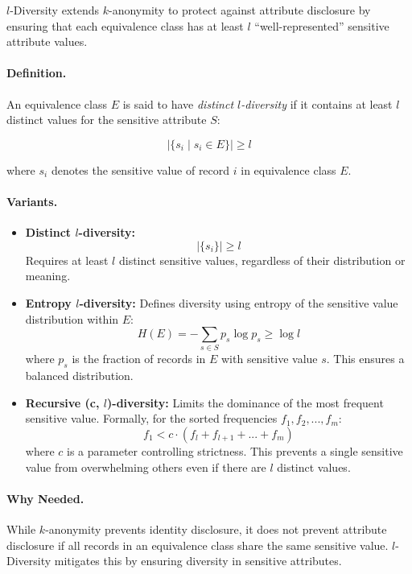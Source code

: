 \documentclass{article}
\begin{document}
$l$-Diversity extends $k$-anonymity to protect against attribute disclosure by ensuring that each equivalence class has at least $l$ ``well-represented'' sensitive attribute values.

\paragraph{ Definition.}
An equivalence class $E$ is said to have \textit{distinct $l$-diversity} if it contains at least $l$ distinct values for the sensitive attribute $S$:

\[
|\{ s_i \mid s_i \in E \}| \geq l
\]

where $s_i$ denotes the sensitive value of record $i$ in equivalence class $E$.

\paragraph{Variants.}
\begin{itemize}
    \item \textbf{Distinct $l$-diversity:}
    \[
    |\{ s_i \}| \geq l
    \]
    Requires at least $l$ distinct sensitive values, regardless of their distribution or meaning.

    \item \textbf{Entropy $l$-diversity:}
    Defines diversity using entropy of the sensitive value distribution within $E$:
    \[
    H(E) = - \sum_{s \in S} p_s \log p_s \geq \log l
    \]
    where $p_s$ is the fraction of records in $E$ with sensitive value $s$. This ensures a balanced distribution.

    \item \textbf{Recursive (c, $l$)-diversity:}
    Limits the dominance of the most frequent sensitive value. Formally, for the sorted frequencies $f_1, f_2, ..., f_m$:
    \[
    f_1 < c \cdot (f_l + f_{l+1} + ... + f_m)
    \]
    where $c$ is a parameter controlling strictness. This prevents a single sensitive value from overwhelming others even if there are $l$ distinct values.
\end{itemize}

\paragraph{Why Needed.}
While $k$-anonymity prevents identity disclosure, it does not prevent attribute disclosure if all records in an equivalence class share the same sensitive value. $l$-Diversity mitigates this by ensuring diversity in sensitive attributes.
\end{document}
